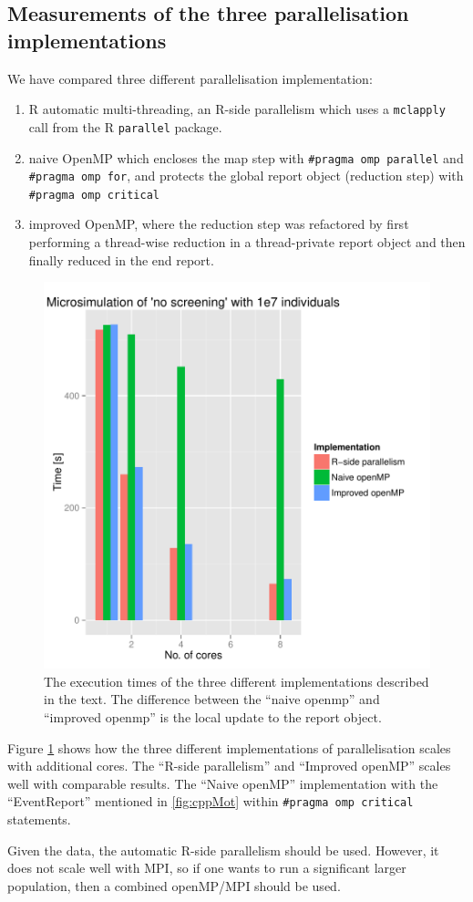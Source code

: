 \subsection{Measurements of the three parallelisation implementations}

We have compared three different parallelisation implementation: 
\begin{enumerate}
\item R automatic multi-threading, an R-side parallelism which uses a
  \texttt{mclapply} call from the R \texttt{parallel} package.
\item naive OpenMP which encloses the map step with \texttt{\#pragma
    omp parallel} and \texttt{\#pragma omp for}, and protects the
  global report object (reduction step) with \texttt{\#pragma omp
    critical}
\item improved OpenMP, where the reduction step was refactored by
  first performing a thread-wise reduction in a thread-private report
  object and then finally reduced in the end report.
\end{enumerate}
\begin{figure}[!htbp] \centering
  \includegraphics[height=0.5\textheight]{images/implementationProfiling.pdf}
  \caption{The execution times of the three different implementations
    described in the text. The difference between the ``naive openmp''
  and ``improved openmp'' is the local update to the report
  object.}
  \label{fig:implScaling}
\end{figure} 
Figure \ref{fig:implScaling} shows how the three
different implementations of parallelisation scales with additional
cores. The ``R-side parallelism'' and ``Improved openMP'' scales
well with comparable results. The ``Naive openMP'' implementation
with the ``EventReport'' mentioned in \ref{fig:cppMot} within
\texttt{\#pragma omp critical} statements. 

Given the data, the automatic R-side parallelism should be
used. However, it does not scale well with MPI, so if one wants to run a
significant larger population, then a combined openMP/MPI should be
used. 


